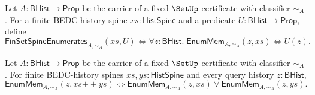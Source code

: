 \begin{definition}
\label{def:finset-spine-enumerates-predicate}
Let $A:\mathsf{BHist}\to\mathsf{Prop}$ be the carrier of a fixed $\SetUp$ certificate with classifier $\sim_A$. For a finite BEDC-history spine $xs:\mathsf{HistSpine}$ and a predicate $U:\mathsf{BHist}\to\mathsf{Prop}$, define
$$
\mathsf{FinSetSpineEnumerates}_{A,\sim_A}(xs,U)
\Longleftrightarrow
\forall z:\mathsf{BHist}.\;
\mathsf{EnumMem}_{A,\sim_A}(z,xs)\Longleftrightarrow U(z).
$$
\end{definition}

\begin{lemma}
\label{lem:finset-enummem-append-split}
Let $A:\mathsf{BHist}\to\mathsf{Prop}$ be the carrier of a fixed $\SetUp$ certificate with classifier $\sim_A$. For finite BEDC-history spines $xs,ys:\mathsf{HistSpine}$ and every query history $z:\mathsf{BHist}$,
$$
\mathsf{EnumMem}_{A,\sim_A}(z,xs{++}ys)
\Longleftrightarrow
\mathsf{EnumMem}_{A,\sim_A}(z,xs)\vee
\mathsf{EnumMem}_{A,\sim_A}(z,ys).
$$
\end{lemma}
